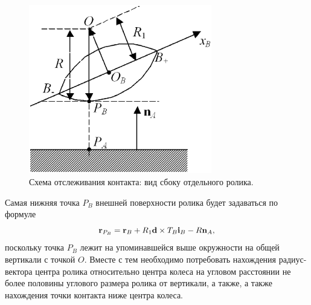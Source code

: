 \begin{figure}[htb]
\centering\includegraphics[width=8cm]{content/parts/3_friction/nd/RollerSection.eps}
\caption{Схема отслеживания контакта: вид сбоку отдельного ролика.}
\label{ContactScheme}
\end{figure}

Самая нижняя точка $P_B$ внешней 
поверхности ролика будет задаваться по формуле
\begin{equation}
{\bf r}_{P_B}={\bf r}_B+R_1{\bf d}\times T_B{\bf i}_B-R{\bf n}_A,
\label{3_2_0}
\end{equation}
поскольку точка $P_B$ лежит на упоминавшейся выше окружности на общей вертикали 
с точкой $O$.
Вместе с тем необходимо потребовать нахождения радиус-вектора центра ролика
относительно центра колеса на угловом расстоянии не более половины углового размера ролика от вертикали,
а также, а также нахождения точки контакта ниже центра колеса.

